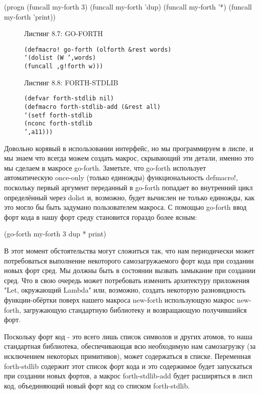 (progn
(funcall my-forth 3)
(funcall my-forth ’dup)
(funcall my-forth ’*)
(funcall my-forth ’print))

\begin{figure}Листинг 8.7: GO-FORTH\label{listing_8.7}
\listbegin
\begin{verbatim}
(defmacro! go-forth (olforth &rest words)
‘(dolist (W ’,words)
(funcall ,g!forth w)))
\end{verbatim}
\listend
\end{figure}

\begin{figure}Листинг 8.8: FORTH-STDLIB\label{listing_8.8}
\listbegin
\begin{verbatim}
(defvar forth-stdlib nil)
(defmacro forth-stdlib-add (&rest all)
‘(setf forth-stdlib
(nconc forth-stdlib
’,a11)))
\end{verbatim}
  \listend
\end{figure}

Довольно корявый в использовании интерфейс, но мы программируем в лиспе, и мы знаем что всегда можем создать макрос, скрывающий эти детали, именно это мы сделаем в макросе go-forth. Заметьте, что go-forth использует автоматическую once-only (только единожды) функциональность defmacro!, поскольку первый аргумент переданный в go-forth попадает во внутренний цикл определённый через dolist и, возможно, будет вычислен не только единожды, как это могло бы быть задумано пользователем макроса. С помощью go-forth ввод форт кода в нашу форт среду становится гораздо более ясным:

(go-forth my-forth
3 dup * print)

В этот момент обстоятельства могут сложиться так, что нам периодически может потребоваться выполнение некоторого самозагружаемого форт кода при создании новых форт сред. Мы должны быть в состоянии вызвать замыкание при создании сред. Что в свою очередь может потребовать изменить архитектуру приложения "Let, окружающий Lambda" или, возможно, создать некоторую разновидность функции-обёртки поверх нашего макроса new-forth использующую макрос new-forth, загружающую стандартную библиотеку и возвращающую получившийся форт.

Поскольку форт код - это всего лишь список символов и других атомов, то наша стандартная библиотека, обеспечивающая всю необходимую нам самозагрузку (за исключением некоторых примитивов), может содержаться в списке. Переменная forth-stdlib содержит этот список форт кода и это содержимое будет запускаться при создании новых фортов, а макрос forth-stdlib-add будет расширяться в лисп код, объединяющий новый форт код со списком forth-stdlib.

